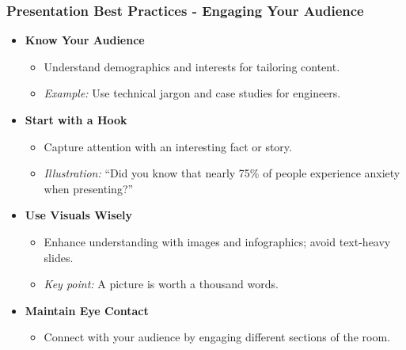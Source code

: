 \documentclass{beamer}
\begin{document}
\begin{frame}[fragile]
    \frametitle{Presentation Best Practices - Engaging Your Audience}
    \begin{itemize}
        \item \textbf{Know Your Audience}
        \begin{itemize}
            \item Understand demographics and interests for tailoring content.
            \item \textit{Example:} Use technical jargon and case studies for engineers.
        \end{itemize}
        
        \item \textbf{Start with a Hook}
        \begin{itemize}
            \item Capture attention with an interesting fact or story.
            \item \textit{Illustration:} “Did you know that nearly 75\% of people experience anxiety when presenting?”
        \end{itemize}
        
        \item \textbf{Use Visuals Wisely}
        \begin{itemize}
            \item Enhance understanding with images and infographics; avoid text-heavy slides.
            \item \textit{Key point:} A picture is worth a thousand words.
        \end{itemize}
        
        \item \textbf{Maintain Eye Contact}
        \begin{itemize}
            \item Connect with your audience by engaging different sections of the room.
        \end{itemize}
    \end{itemize}
\end{frame}
\end{document}

